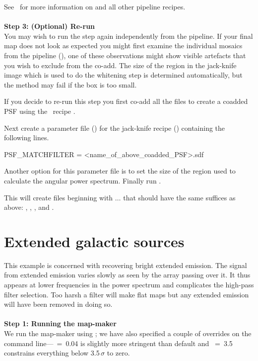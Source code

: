 See \pipelinesun\ for more information on
 and all other pipeline
recipes.
\\ \\
\textbf{Step 3: (Optional) Re-run }\\
You may wish to run the  step again
independently from the pipeline. If your final map does not look as
expected you might first examine the individual mosaics from the
pipeline (), one of these observations might show visible
artefacts that you wish to exclude from the co-add. The size of the
region in the jack-knife image which is used to do the whitening step
is determined automatically, but the method may fail if the box is too
small.

If you decide to re-run this step you first co-add all the
 files to create a coadded PSF using the \picard\ recipe
.
\begin{terminalv}
\end{terminalv}
Next create a parameter file () for the jack-knife
recipe () containing the following lines.
\begin{terminalv}
PSF_MATCHFILTER = <name_of_above_coadded_PSF>.sdf
\end{terminalv}
Another option for this parameter file is  to set the
size of the region used to calculate the angular power spectrum.
Finally run .
\begin{terminalv}
\end{terminalv}
This will create files beginning with $\ldots$ that
should have the same suffices as above: ,
, , and .



\section{Extended galactic sources}
\label{sec:bright_ex}

This example is concerned with recovering bright extended emission.
The signal from extended emission varies slowly as seen by the array
passing over it. It thus appears at lower frequencies in the power
spectrum and complicates the high-pass filter selection. Too harsh a
filter will make flat maps but any extended emission will have been
removed in doing so.
\\ \\
\textbf{Step 1: Running the map-maker}
\vspace{0.2cm}\\
We run the map-maker using ;
we have also specified a couple of overrides on the command
line---~=~0.04 is slightly more stringent than default and
~=~3.5 constrains everything below
3.5\,$\sigma$ to zero.

